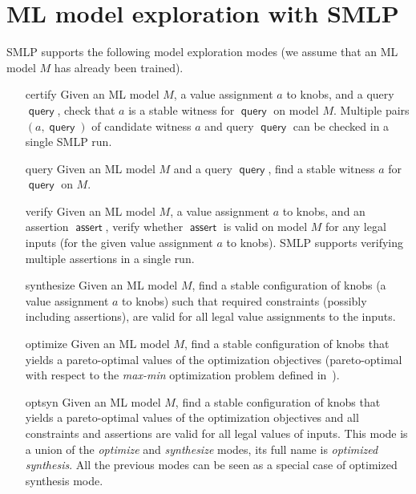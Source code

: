 \documentclass[a4paper,parskip=half]{article} %
\newcommand*\query{\operatorname{\mathsf{query}}}
\newcommand*\assert{\operatorname{\mathsf{assert}}}
\begin{document}
\section{ML model exploration with SMLP}\label{sec:exploration}

SMLP supports the following model exploration modes (we assume that an ML model $M$ has already been trained). 
\begin{itemize}
\item[certify] Given an ML model $M$, a value assignment $a$ to knobs, and a query $\query$, check that $a$ is a stable 
witness for $\query$ on model $M$. Multiple pairs $(a,\query)$ of candidate witness $a$ and query $\query$ can be checked 
in a single SMLP run.
\item[query] Given an ML model $M$  and a query $\query$, find a stable witness $a$  for $\query$ on $M$.
\item[verify] Given an ML model $M$,  a value assignment $a$ to knobs,  and an assertion $\assert$, verify whether  
$\assert$ is valid on model $M$ for any legal inputs (for the given value assignment $a$ to knobs). SMLP supports verifying 
multiple assertions in a single run.
\item[synthesize] Given an ML model $M$,  find a stable configuration of knobs (a value assignment $a$ to knobs) 
such that required constraints (possibly including assertions),  are valid for all legal value assignments to the inputs.
\item[optimize]  Given an ML model $M$,  find a stable configuration of knobs that yields a pareto-optimal values of 
the optimization objectives (pareto-optimal with respect to the \emph{max-min} optimization problem defined 
in~\cite{brausse2024smlp}).
\item[optsyn] Given an ML model $M$,  find a stable configuration of knobs that yields a pareto-optimal values of the 
optimization objectives and all constraints and assertions are valid for all legal values of inputs. This mode is a union 
of the \emph{optimize} and \emph{synthesize} modes, its full name is \emph{optimized synthesis}. 
All the previous modes can be seen as a special case of optimized synthesis mode.
\end{itemize}
\end{document}
